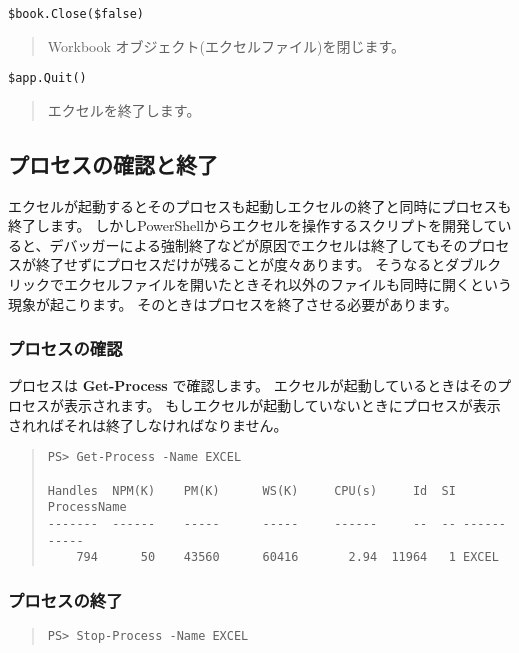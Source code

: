 \documentclass[dvipdfmx]{jsarticle}
\begin{document}
\vspace{\baselineskip}

\verb+$book.Close($false)+
\begin{quote}
Workbook オブジェクト(エクセルファイル)を閉じます。
\end{quote}


\vspace{\baselineskip}

\verb+$app.Quit()+
\begin{quote}
エクセルを終了します。
\end{quote}



\subsection{プロセスの確認と終了}
エクセルが起動するとそのプロセスも起動しエクセルの終了と同時にプロセスも終了します。
しかしPowerShellからエクセルを操作するスクリプトを開発していると、デバッガーによる強制終了などが原因でエクセルは終了してもそのプロセスが終了せずにプロセスだけが残ることが度々あります。
そうなるとダブルクリックでエクセルファイルを開いたときそれ以外のファイルも同時に開くという現象が起こります。
そのときはプロセスを終了させる必要があります。


\subsubsection{プロセスの確認}
プロセスは \textbf{Get-Process} で確認します。
エクセルが起動しているときはそのプロセスが表示されます。
もしエクセルが起動していないときにプロセスが表示されればそれは終了しなければなりません。

\begin{quote}
\begin{verbatim}
PS> Get-Process -Name EXCEL

Handles  NPM(K)    PM(K)      WS(K)     CPU(s)     Id  SI ProcessName                                      
-------  ------    -----      -----     ------     --  -- -----------                                      
    794      50    43560      60416       2.94  11964   1 EXCEL 
\end{verbatim}
\end{quote}


\subsubsection{プロセスの終了}

\begin{quote}
\begin{verbatim}
PS> Stop-Process -Name EXCEL
\end{verbatim}
\end{quote}
\end{document}
